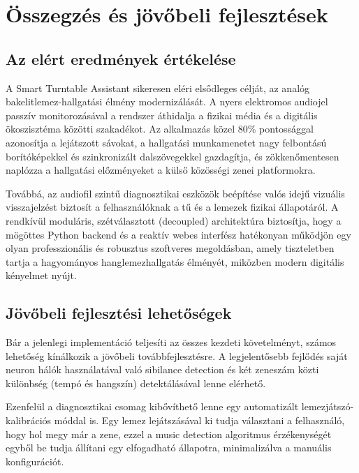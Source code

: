 
\chapter{Összegzés és jövőbeli fejlesztések}

\section{Az elért eredmények értékelése}
A Smart Turntable Assistant sikeresen eléri elsődleges célját, az analóg bakelitlemez-hallgatási élmény modernizálását. A nyers elektromos audiojel passzív monitorozásával a rendszer áthidalja a fizikai média és a digitális ökoszisztéma közötti szakadékot. Az alkalmazás közel 80\% pontossággal azonosítja a lejátszott sávokat, a hallgatási munkamenetet nagy felbontású borítóképekkel és szinkronizált dalszövegekkel gazdagítja, és zökkenőmentesen naplózza a hallgatási előzményeket a külső közösségi zenei platformokra.

Továbbá, az audiofil szintű diagnosztikai eszközök beépítése valós idejű vizuális visszajelzést biztosít a felhasználóknak a tű és a lemezek fizikai állapotáról. A rendkívül moduláris, szétválasztott (decoupled) architektúra biztosítja, hogy a mögöttes Python backend és a reaktív webes interfész hatékonyan működjön egy olyan professzionális és robusztus szoftveres megoldásban, amely tiszteletben tartja a hagyományos hanglemezhallgatás élményét, miközben modern digitális kényelmet nyújt.

\section{Jövőbeli fejlesztési lehetőségek}
Bár a jelenlegi implementáció teljesíti az összes kezdeti követelményt, számos lehetőség kínálkozik a jövőbeli továbbfejlesztésre. A legjelentősebb fejlődés saját neuron hálók használatával való sibilance detection és két zeneszám közti különbség (tempó és hangszín) detektálásával lenne elérhető.

Ezenfelül a diagnosztikai csomag kibővíthető lenne egy automatizált lemezjátszó-kalibrációs móddal is. Egy lemez lejátszásával ki tudja választani a felhasználó, hogy hol megy már a zene, ezzel a music detection algoritmus érzékenységét egyből be tudja állítani egy elfogadható állapotra, minimalizálva a manuális konfigurációt.